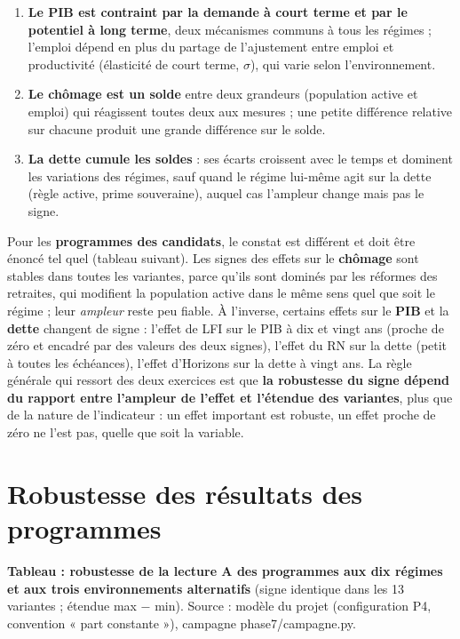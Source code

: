 \documentclass[
  11pt,
  11pt,
  a4paper,
  openany]{book}
\providecommand{\tightlist}{%
  \setlength{\itemsep}{0pt}\setlength{\parskip}{0pt}}
\begin{document}
\begin{enumerate}
\def\labelenumi{\arabic{enumi}.}
\tightlist
\item
  \textbf{Le PIB est contraint par la demande à court terme et par le
  potentiel à long terme}, deux mécanismes communs à tous les régimes ;
  l'emploi dépend en plus du partage de l'ajustement entre emploi et
  productivité (élasticité de court terme, \(\sigma\)), qui varie selon
  l'environnement.
\item
  \textbf{Le chômage est un solde} entre deux grandeurs (population
  active et emploi) qui réagissent toutes deux aux mesures ; une petite
  différence relative sur chacune produit une grande différence sur le
  solde.
\item
  \textbf{La dette cumule les soldes} : ses écarts croissent avec le
  temps et dominent les variations des régimes, sauf quand le régime
  lui-même agit sur la dette (règle active, prime souveraine), auquel
  cas l'ampleur change mais pas le signe.
\end{enumerate}

Pour les \textbf{programmes des candidats}, le constat est différent et
doit être énoncé tel quel (tableau suivant). Les signes des effets sur
le \textbf{chômage} sont stables dans toutes les variantes, parce qu'ils
sont dominés par les réformes des retraites, qui modifient la population
active dans le même sens quel que soit le régime ; leur \emph{ampleur}
reste peu fiable. À l'inverse, certains effets sur le \textbf{PIB} et la
\textbf{dette} changent de signe : l'effet de LFI sur le PIB à dix et
vingt ans (proche de zéro et encadré par des valeurs des deux signes),
l'effet du RN sur la dette (petit à toutes les échéances), l'effet
d'Horizons sur la dette à vingt ans. La règle générale qui ressort des
deux exercices est que \textbf{la robustesse du signe dépend du rapport
entre l'ampleur de l'effet et l'étendue des variantes}, plus que de la
nature de l'indicateur : un effet important est robuste, un effet proche
de zéro ne l'est pas, quelle que soit la variable.

\hypertarget{sec:robustesse-programmes}{%
\section{Robustesse des résultats des
programmes}\label{sec:robustesse-programmes}}

\textbf{Tableau : robustesse de la lecture A des programmes aux dix
régimes et aux trois environnements alternatifs} (signe identique dans
les 13 variantes ; étendue max − min). Source : modèle du projet
(configuration P4, convention « part constante »), campagne
phase7/campagne.py.
\end{document}
